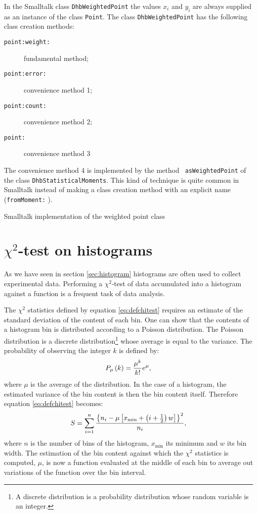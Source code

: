 \documentclass[twoside]{book}
\begin{document}
In the Smalltalk class {\tt DhbWeightedPoint} the values $x_i$ and
$y_i$ are always supplied as an instance of the class {\tt Point}.
The class {\tt DhbWeightedPoint} has the following class creation
methods:
\begin{description}
  \item[\tt point:weight:] fundamental method;
  \item[\tt point:error:] convenience method 1;
  \item[\tt point:count:] convenience method 2;
  \item[\tt point:] convenience method 3
\end{description}
The convenience method 4 is implemented by the method {\tt
asWeightedPoint} of the class {\tt DhbStatisticalMoments}. This
kind of technique is quite common in Smalltalk instead of making a
class creation method with an explicit name ({\tt fromMoment:}
\eg).

\begin{listing} Smalltalk implementation of the weighted point class
\label{ls:weightedPoint}


\end{listing}

\section{$\chi^2$-test on histograms}
\label{sec:chitesthist} As we have seen in section
\ref{sec:histogram} histograms are often used to collect
experimental data. Performing a $\chi^2$-test of data accumulated
into a histogram against a function is a frequent task of data
analysis.

The $\chi^2$ statistics defined by equation \ref{eq:defchitest}
requires an estimate of the standard deviation of the content of
each bin. One can show that the contents of a histogram bin is
distributed according to a Poisson distribution. The Poisson
distribution is a discrete distribution\footnote{A discrete
distribution is a probability distribution whose random variable
is an integer.} whose average is equal to the variance. The
probability of observing the integer $k$ is defined by:
\begin{equation}
 P_{\mu}\left(k\right)= {\mu^k\over k!}e^{\mu},
\end{equation}
where $\mu$ is the average of the distribution. In the case of a
histogram, the estimated variance of the bin content is then the
bin content itself. Therefore equation \ref{eq:defchitest}
becomes:
\begin{equation}
\label{eq:defchitesthist}
  S=\sum_{i=1}^n
  { \left\{n_i - \mu\left[x_{\min} + \left(i+{1\over 2} \right)w\right]\right\}^2 \over
  n_i},
\end{equation}
where $n$ is the number of bins of the histogram, $x_{\min}$ its
minimum and $w$ its bin width. The estimation of the bin content
against which the $\chi^2$ statistics is computed, $\mu$, is now a
function evaluated at the middle of each bin to average out
variations of the function over the bin interval.
\end{document}
